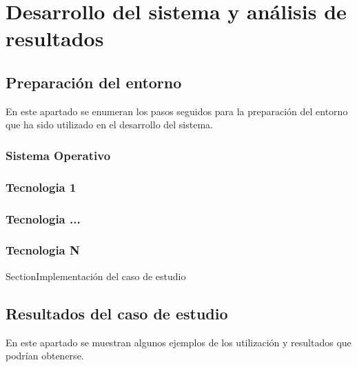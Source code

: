 \chapter{Desarrollo del sistema y análisis de resultados}
\label{chapter:background}

\section{Preparación del entorno}
En este apartado se enumeran los pasos seguidos para la preparación del entorno que ha sido utilizado en el desarrollo del sistema.

\subsection{Sistema Operativo}


\subsection{Tecnologia 1}
\subsection{Tecnologia ...}
\subsection{Tecnologia N}

Section{Implementación del caso de estudio} \label{Implementación del caso de estudio}


\section{Resultados del caso de estudio}

En este apartado se muestran algunos ejemplos de los utilización y resultados que podrían obtenerse.

